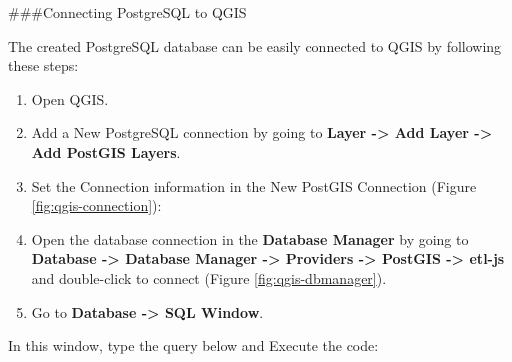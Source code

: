 \documentclass[
  10pt,
  b5paper,
  oneside]{book}
\begin{document}
\#\#\#Connecting PostgreSQL to QGIS

The created PostgreSQL database can be easily connected to QGIS by following these steps:

\begin{enumerate}
\def\labelenumi{\arabic{enumi}.}
\item
  Open QGIS.
\item
  Add a New PostgreSQL connection by going to \textbf{Layer -\textgreater{} Add Layer -\textgreater{} Add PostGIS Layers}.
\item
  Set the Connection information in the New PostGIS Connection (Figure \ref{fig:qgis-connection}):
\item
  Open the database connection in the \textbf{Database Manager} by going to \textbf{Database -\textgreater{} Database Manager -\textgreater{} Providers -\textgreater{} PostGIS -\textgreater{} etl-js} and double-click to connect (Figure \ref{fig:qgis-dbmanager}).
\item
  Go to \textbf{Database -\textgreater{} SQL Window}.
\end{enumerate}

In this window, type the query below and Execute the code:
\end{document}
